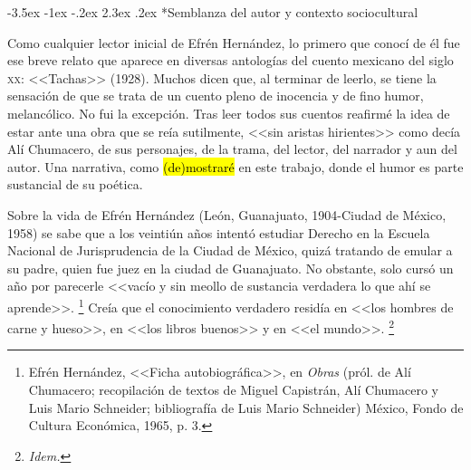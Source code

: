 \documentclass[14pt,twoside,final]{extbook} %
\makeatletter
\let\oldfootnote\footnote
\renewcommand\footnote[1]{%
\oldfootnote{\hspace{1mm}#1}}
\renewcommand\section{\@startsection {section}{1}{\z@}%
                                     {-3.5ex \@plus -1ex \@minus -.2ex}%
                                     {2.3ex \@plus .2ex}%
                                     {\normalfont\large\bfseries\sc}}
\makeatother
\begin{document}
\section*{Semblanza del autor y contexto sociocultural}\label{sec:semblanza-del-autor-y-contexto-sociocultural}
Como cualquier lector inicial de Efrén Hernández, lo primero que conocí de él fue ese breve relato que aparece en diversas antologías del cuento mexicano del siglo \textsc{xx}: <<Tachas>> (1928). Muchos dicen que, al terminar de leerlo, se tiene la sensación de que se trata de un cuento pleno de inocencia y de fino humor, melancólico. No fui la excepción. Tras leer todos sus cuentos reafirmé la idea de estar ante una obra que se reía sutilmente, <<sin aristas hirientes>> como decía Alí Chumacero, de sus personajes, de la trama, del lector, del narrador y aun del autor. Una narrativa, como \hl{(de)mostraré} en este trabajo, donde el humor es parte sustancial de su poética.

Sobre la vida de Efrén Hernández (León, Guanajuato, 1904-Ciudad de México, 1958) se sabe que a los veintiún años intentó estudiar Derecho en la Escuela Nacional de Jurisprudencia de la Ciudad de México, quizá tratando de emular a su padre, quien fue juez en la ciudad de Guanajuato. No obstante, solo cursó un año por parecerle <<vacío y sin meollo de sustancia verdadera lo que ahí se aprende>>.\footnote{Efrén Hernández, <<Ficha autobiográfica>>, en \emph{Obras} (pról. de Alí Chumacero; recopilación de textos de Miguel Capistrán, Alí Chumacero y Luis Mario Schneider; bibliografía de Luis Mario Schneider) México, Fondo de Cultura Económica, 1965, p. 3.} Creía que el conocimiento verdadero residía en <<los hombres de carne y hueso>>, en <<los libros buenos>> y en <<el mundo>>.\footnote{\emph{Idem.}}
\end{document}
